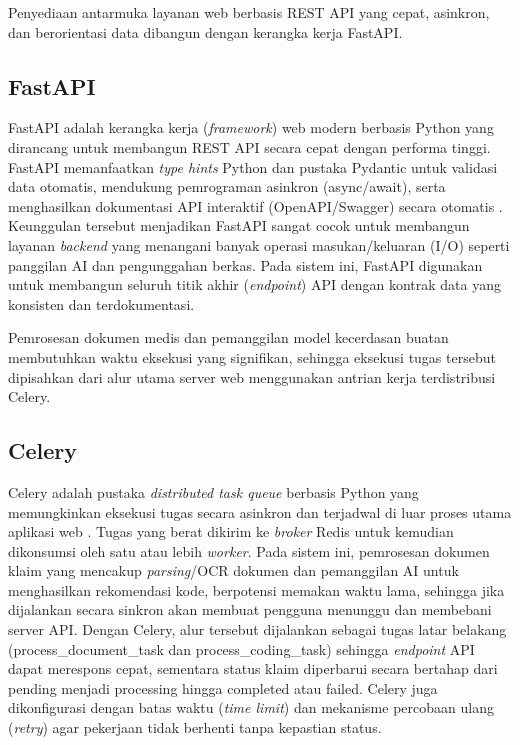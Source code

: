 Penyediaan antarmuka layanan web berbasis REST API yang cepat, asinkron, dan berorientasi data dibangun dengan kerangka kerja FastAPI.

\subsection{FastAPI}
FastAPI adalah kerangka kerja (\textit{framework}) web modern berbasis Python yang dirancang untuk membangun REST API secara cepat dengan performa tinggi. FastAPI memanfaatkan \textit{type hints} Python dan pustaka Pydantic untuk validasi data otomatis, mendukung pemrograman asinkron (async/await), serta menghasilkan dokumentasi API interaktif (OpenAPI/Swagger) secara otomatis \cite{7}. Keunggulan tersebut menjadikan FastAPI sangat cocok untuk membangun layanan \textit{backend} yang menangani banyak operasi masukan/keluaran (I/O) seperti panggilan AI dan pengunggahan berkas. Pada sistem ini, FastAPI digunakan untuk membangun seluruh titik akhir (\textit{endpoint}) API dengan kontrak data yang konsisten dan terdokumentasi.

Pemrosesan dokumen medis dan pemanggilan model kecerdasan buatan membutuhkan waktu eksekusi yang signifikan, sehingga eksekusi tugas tersebut dipisahkan dari alur utama server web menggunakan antrian kerja terdistribusi Celery.

\subsection{Celery}
Celery adalah pustaka \textit{distributed task queue} berbasis Python yang memungkinkan eksekusi tugas secara asinkron dan terjadwal di luar proses utama aplikasi web \cite{4}. Tugas yang berat dikirim ke \textit{broker} Redis untuk kemudian dikonsumsi oleh satu atau lebih \textit{worker}. Pada sistem ini, pemrosesan dokumen klaim yang mencakup \textit{parsing}/OCR dokumen dan pemanggilan AI untuk menghasilkan rekomendasi kode, berpotensi memakan waktu lama, sehingga jika dijalankan secara sinkron akan membuat pengguna menunggu dan membebani server API. Dengan Celery, alur tersebut dijalankan sebagai tugas latar belakang (process\_document\_task dan process\_coding\_task) sehingga \textit{endpoint} API dapat merespons cepat, sementara status klaim diperbarui secara bertahap dari pending menjadi processing hingga completed atau failed. Celery juga dikonfigurasi dengan batas waktu (\textit{time limit}) dan mekanisme percobaan ulang (\textit{retry}) agar pekerjaan tidak berhenti tanpa kepastian status.

